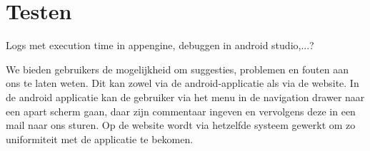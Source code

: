 
\chapter{Testen}

Logs met execution time in appengine, debuggen in android studio,...?


We bieden gebruikers de mogelijkheid om suggesties, problemen en fouten aan ons te laten weten.
Dit kan zowel via de android-applicatie als via de website. In de android applicatie kan de gebruiker via het menu in de navigation drawer %
naar een apart scherm gaan, daar zijn commentaar ingeven en vervolgens deze in een mail naar ons sturen.
Op de website wordt via hetzelfde systeem gewerkt om zo uniformiteit met de applicatie te bekomen.